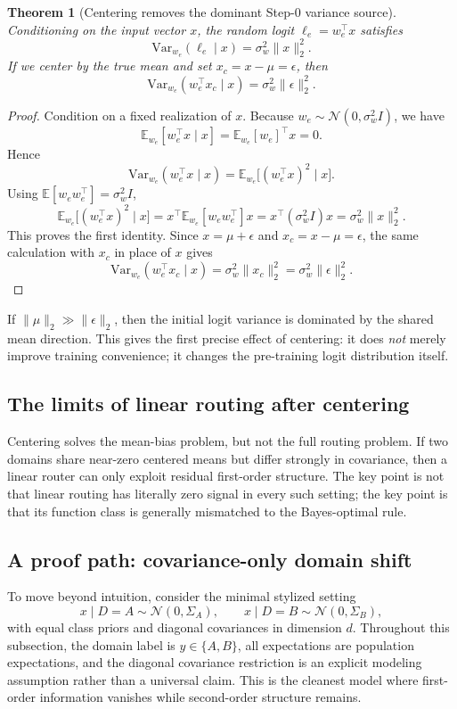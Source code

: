 \documentclass[11pt]{article}
\newtheorem{theorem}{Theorem}
\begin{document}
\begin{theorem}[Centering removes the dominant Step-0 variance source]
Conditioning on the input vector $x$, the random logit $\ell_e=w_e^\top x$ satisfies
\[
\mathrm{Var}_{w_e}(\ell_e\mid x)=\sigma_w^2\|x\|_2^2.
\]
If we center by the true mean and set $x_c=x-\mu=\epsilon$, then
\[
\mathrm{Var}_{w_e}(w_e^\top x_c\mid x)=\sigma_w^2\|\epsilon\|_2^2.
\]
\end{theorem}

\begin{proof}
Condition on a fixed realization of $x$. Because $w_e\sim\mathcal{N}(0,\sigma_w^2 I)$, we have
\[
\mathbb{E}_{w_e}[w_e^\top x\mid x]
=
\mathbb{E}_{w_e}[w_e]^\top x
=
0.
\]
Hence
\[
\mathrm{Var}_{w_e}(w_e^\top x\mid x)
=
\mathbb{E}_{w_e}\big[(w_e^\top x)^2\mid x\big].
\]
Using $\mathbb{E}[w_e w_e^\top]=\sigma_w^2 I$,
\[
\mathbb{E}_{w_e}\big[(w_e^\top x)^2\mid x\big]
=
x^\top \mathbb{E}_{w_e}[w_e w_e^\top] x
=
x^\top (\sigma_w^2 I)x
=
\sigma_w^2\|x\|_2^2.
\]
This proves the first identity. Since $x=\mu+\epsilon$ and $x_c=x-\mu=\epsilon$, the same calculation with $x_c$ in place of $x$ gives
\[
\mathrm{Var}_{w_e}(w_e^\top x_c\mid x)
=
\sigma_w^2\|x_c\|_2^2
=
\sigma_w^2\|\epsilon\|_2^2.
\]
\end{proof}

If $\|\mu\|_2\gg\|\epsilon\|_2$, then the initial logit variance is dominated by the shared mean direction. This gives the first precise effect of centering: it does \emph{not} merely improve training convenience; it changes the pre-training logit distribution itself.

\subsection{The limits of linear routing after centering}
Centering solves the mean-bias problem, but not the full routing problem. If two domains share near-zero centered means but differ strongly in covariance, then a linear router can only exploit residual first-order structure. The key point is not that linear routing has literally zero signal in every such setting; the key point is that its function class is generally mismatched to the Bayes-optimal rule.

\subsection{A proof path: covariance-only domain shift}
To move beyond intuition, consider the minimal stylized setting
\[
x\mid D=A \sim \mathcal{N}(0,\Sigma_A),
\qquad
x\mid D=B \sim \mathcal{N}(0,\Sigma_B),
\]
with equal class priors and diagonal covariances in dimension $d$. Throughout this subsection, the domain label is $y\in\{A,B\}$, all expectations are population expectations, and the diagonal covariance restriction is an explicit modeling assumption rather than a universal claim. This is the cleanest model where first-order information vanishes while second-order structure remains.
\end{document}
